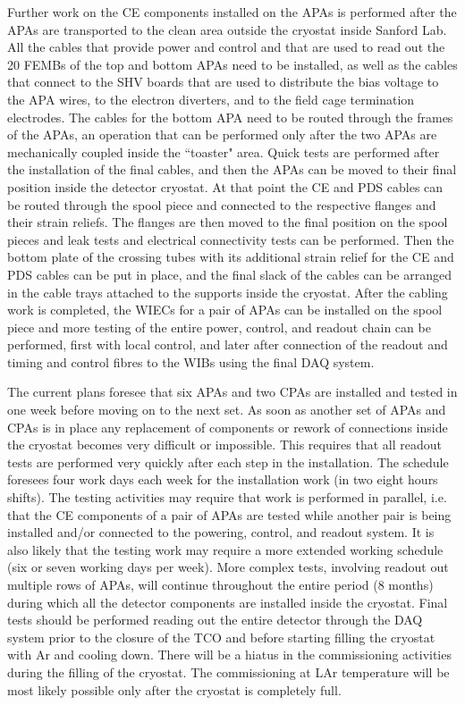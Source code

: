 Further work on the CE components installed on the APAs is performed after
the APAs are transported to the clean area outside the cryostat inside
Sanford Lab. All the cables that provide power and control and that are used
to read out the 20 FEMBs of the top and bottom APAs need to be installed,
as well as the cables that connect to the SHV boards that are used to
distribute the bias voltage to the APA wires, to the electron diverters,
and to the field cage termination electrodes. The cables for the bottom
APA need to be routed through the frames of the APAs, an operation that
can be performed only after the two APAs are mechanically coupled inside
the ``toaster" area. Quick tests are performed after the installation of the
final cables, and then the APAs can be moved to their final position inside
the detector cryostat. At that point the CE and PDS cables can be routed
through the spool piece and connected to the respective flanges and their strain
reliefs. The flanges are then moved to the final position on the spool pieces
and leak tests and electrical connectivity tests can be performed. Then the
bottom plate of the crossing tubes with its additional strain relief for
the CE and PDS cables can be put in place, and the final slack of the cables
can be arranged in the cable trays attached to the supports inside the cryostat.
After the cabling work is completed, the WIECs for a pair of APAs can be
installed on the spool piece and more testing of the entire power, control,
and readout chain can be performed, first with local control, and later
after connection of the readout and timing and control fibres to the WIBs
using the final DAQ system.

The current plans foresee that six APAs and two CPAs are installed and
tested in one week before moving on to the next set. As soon as another
set of APAs and CPAs is in place any replacement of components or rework
of connections inside the cryostat becomes very difficult or impossible.
This requires that all readout tests are performed very quickly after
each step in the installation. The schedule foresees four work days each
week for the installation work (in two eight hours shifts). The testing
activities may require that work is performed in parallel, i.e. that
the CE components of a pair of APAs are tested while another pair is
being installed and/or connected to the powering, control, and readout
system. It is also likely that the testing work may require a more
extended working schedule (six or seven working days per week). More
complex tests, involving readout out multiple rows of APAs, will continue
throughout the entire period (8 months) during which all the detector
components are installed inside the cryostat. Final tests should be
performed reading out the entire detector through the DAQ system
prior to the closure of the TCO and before starting filling the cryostat
with Ar and cooling down. There will be a hiatus in
the commissioning activities during the filling of the cryostat. The
commissioning at LAr temperature will be most likely possible only
after the cryostat is completely full.
